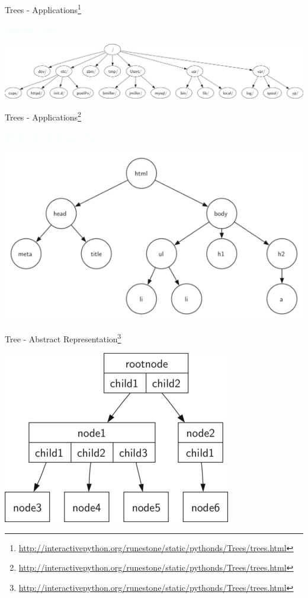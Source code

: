\documentclass{beamer}
\newcommand{\tblue}[1]{{\Large {\textcolor{azure}{#1}}}}
\begin{document}
\begin{frame}{Trees - Applications\footnote{\url{http://interactivepython.org/runestone/static/pythonds/Trees/trees.html}}}

\tblue{Directory Tree:}
\begin{center}
    \includegraphics[scale=0.5]{treesEg3.png}
\end{center}
\end{frame}


\begin{frame}{Trees - Applications\footnote{\url{http://interactivepython.org/runestone/static/pythonds/Trees/trees.html}}}

\tblue{HTML DOM (Parse) Tree:}
\begin{center}
    \includegraphics[scale=0.75]{treesEg4.png}
\end{center}
\end{frame}


\begin{frame}{Tree - Abstract Representation\footnote{\url{http://interactivepython.org/runestone/static/pythonds/Trees/trees.html}}}
\begin{center}
    \includegraphics[scale=0.7]{treedef1.png}
\end{center}
\end{frame}
\end{document}
